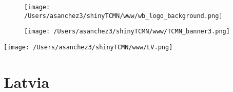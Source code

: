 \documentclass{article}\usepackage[]{graphicx}\usepackage[]{color}
\begin{document}
%

\begin{figure}
  \vspace{-3ex} %
  \hspace{-7ex} %
  \texttt{[image: /Users/asanchez3/shinyTCMN/www/wb\_logo\_background.png]}
\end{figure}
\begin{figure}
  \begin{minipage}[t]{0.99\textwidth} %
      \vspace{-30ex}
      \hspace{-2ex}
      \raggedright{\texttt{[image: /Users/asanchez3/shinyTCMN/www/TCMN\_banner3.png]}}
  \end{minipage}
\end{figure}
%
\begin{minipage}[t]{0.99\textwidth} %
  \vspace{-1.5cm}
  \begin{minipage}[c]{0.36\textwidth} 
    \begin{minipage}[c]{0.28\textwidth} %
      \texttt{[image: /Users/asanchez3/shinyTCMN/www/LV.png]}
    \end{minipage}
    \begin{minipage}[c]{0.70\textwidth} %
      \section*{\color{blue!40!black}Latvia}
    \end{minipage}
  \end{minipage}
  \begin{minipage}[c]{0.63\textwidth}
    \begin{flushleft}  
    \end{flushleft} 
  \end{minipage}  
\end{minipage} %
\end{document}
